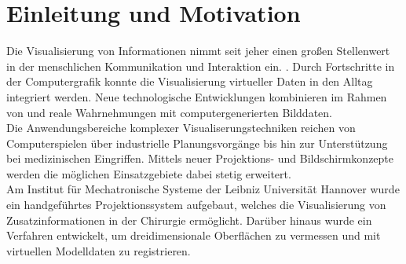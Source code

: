 \chapter{Einleitung und Motivation}

\prever{
}

Die Visualisierung von Informationen nimmt seit jeher einen großen Stellenwert in der menschlichen Kommunikation und Interaktion ein. . Durch Fortschritte in der Computergrafik konnte die Visualisierung virtueller Daten in den Alltag integriert werden. Neue technologische Entwicklungen kombinieren im Rahmen von \red[Virtueller] und  reale Wahrnehmungen mit computergenerierten Bilddaten.\\

Die Anwendungsbereiche komplexer Visualiserungstechniken reichen von Computerspielen über industrielle Planungsvorgänge bis hin zur Unterstützung bei medizinischen Eingriffen. Mittels neuer Projektions- und Bildschirmkonzepte werden die möglichen Einsatzgebiete dabei stetig erweitert.\\
Am Institut für Mechatronische Systeme der Leibniz Universität Hannover wurde ein handgeführtes Projektionssystem aufgebaut, welches die Visualisierung von Zusatzinformationen in der Chirurgie ermöglicht. Darüber hinaus wurde ein Verfahren entwickelt, um dreidimensionale Oberflächen zu vermessen und mit virtuellen Modelldaten zu registrieren.\\

